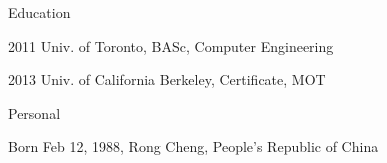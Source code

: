 \begin{vitaesection}{Education}
	\item [2011] Univ. of Toronto, BASc, Computer Engineering
  \item [2013] Univ. of California Berkeley, Certificate, MOT
\end{vitaesection}

\begin{vitaesection}{Personal}
	\item [Born] Feb 12, 1988, 
	Rong Cheng, People's Republic of China
\end{vitaesection}
